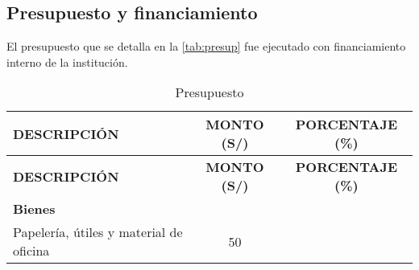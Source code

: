 \documentclass[a4paper]{article}
\begin{document}
\subsection{Presupuesto y
financiamiento}\label{presupuesto-y-financiamiento}

El presupuesto que se detalla en la \autoref{tab:presup} fue ejecutado
con financiamiento interno de la institución.

\begin{longtable}[]{@{}lcc@{}}
\caption{Presupuesto \label{tab:presup}}\tabularnewline
\toprule
\begin{minipage}[b]{0.44\columnwidth}\raggedright\strut
\textbf{DESCRIPCIÓN}\strut
\end{minipage} & \begin{minipage}[b]{0.23\columnwidth}\centering\strut
\textbf{MONTO (S/)}\strut
\end{minipage} & \begin{minipage}[b]{0.23\columnwidth}\centering\strut
\textbf{PORCENTAJE (\%)}\strut
\end{minipage}\tabularnewline
\midrule
\endfirsthead
\toprule
\begin{minipage}[b]{0.44\columnwidth}\raggedright\strut
\textbf{DESCRIPCIÓN}\strut
\end{minipage} & \begin{minipage}[b]{0.23\columnwidth}\centering\strut
\textbf{MONTO (S/)}\strut
\end{minipage} & \begin{minipage}[b]{0.23\columnwidth}\centering\strut
\textbf{PORCENTAJE (\%)}\strut
\end{minipage}\tabularnewline
\midrule
\endhead
\begin{minipage}[t]{0.44\columnwidth}\raggedright\strut
\textbf{Bienes}\strut
\end{minipage} & \begin{minipage}[t]{0.23\columnwidth}\centering\strut
\strut
\end{minipage} & \begin{minipage}[t]{0.23\columnwidth}\centering\strut
\strut
\end{minipage}\tabularnewline
\begin{minipage}[t]{0.44\columnwidth}\raggedright\strut
Papelería, útiles y material de oficina\strut
\end{minipage} & \begin{minipage}[t]{0.23\columnwidth}\centering\strut
50\strut
\end{minipage} & \begin{minipage}[t]{0.23\columnwidth}\centering\strut

\end{minipage}
\end{longtable}
\end{document}
